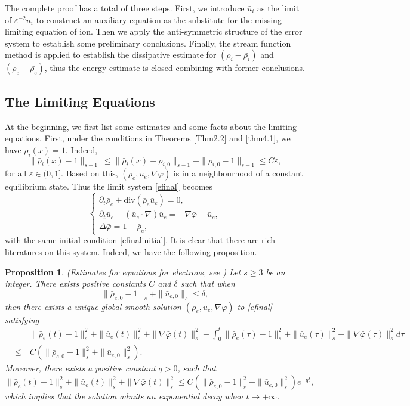 \documentclass[reqno,twoside,12pt,a4paper]{amsart}
\newcommand{\eps}{\mathbb{\varepsilon}}
\newcommand{\dive}{\mathrm{div}}
\newcommand{\pt}{\partial_t}
\newcommand{\D}{\nabla}
\newcommand{\vp}{\varphi}
\newtheorem{proposition}{Proposition}[section]
\numberwithin{equation}{section}
\begin{document}
The complete proof has a total of three steps. First, we introduce $\bar{u}_i$ as the limit of $\eps^{-2}u_i$ to construct an auxiliary equation as the substitute for the missing limiting equation of ion. Then we apply the anti-symmetric structure of the error system to establish some preliminary conclusions. Finally, the stream function method is applied to establish the dissipative estimate for $(\rho_i-\bar{\rho_i})$ and $(\rho_e-\bar{\rho_e})$, thus the energy estimate is closed combining with former conclusions.



\subsection{The Limiting Equations} At the beginning, we first list some estimates and some facts about the limiting equations. First, under the conditions in Theorems \ref{Thm2.2} and \ref{thm4.1}, we have $\bar{\rho}_i(x)=1$. Indeed, 
\[
    \|\bar{\rho}_i(x)-1\|_{s-1}\ \leq \|\bar{\rho}_i(x)-\rho_{i,0}\|_{s-1}+\|\rho_{i,0}-1\|_{s-1} \leq C \eps,
\]
for all $\eps\in(0,1]$. Based on this, $(\bar{\rho}_e, \bar{u}_e, \D\bar{\vp})$  is in a neighbourhood of a constant equilibrium state. Thus the limit system \eqref{efinal} becomes
\begin{equation}\label{efinal2}
\begin{cases}
\pt\bar{\rho}_e +\dive(\bar{\rho}_e \bar{u}_e)=0,\\
\pt \bar{u}_e +(\bar{u}_e\cdot\nabla)\bar{u}_e=-\D\bar{\vp}-\bar{u}_e,\\
\Delta \bar{\vp}=1-\bar{\rho}_e,
\end{cases}
\end{equation}
with the same initial condition \eqref{efinalinitial}. It is clear that there are rich literatures on this system. Indeed, we have the following proposition.
\begin{proposition}\label{danjiep}(Estimates for equations for electrons, see \cite{Hsiao2003,Peng2015}) Let $s\geq 3$ be an integer. There exists positive constants $C$ and $\delta$ such that when 
\[
\|\bar{\rho}_{e,0}-1\|_s+\|\bar{u}_{e,0}\|_s\leq \delta,
\]
then there exists a unique global smooth solution $(\bar{\rho}_e, \bar{u}_e, \D\bar{\vp})$  to \eqref{efinal} satisfying
\begin{eqnarray}\label{eregu}
&\quad& \|\bar{\rho}_e(t)-1\|_s^2+\|\bar{u}_e(t)\|_s^2+\|\D\bar{\vp}(t)\|_s^2+\int_0^t\|\bar{\rho}_e(\tau)-1\|_s^2+\|\bar{u}_e(\tau)\|_s^2+\|\D\bar{\vp}(\tau)\|_s^2d\tau\nonumber\\
&\leq& C(\|\bar{\rho}_{e,0}-1\|_s^2+\|\bar{u}_{e,0}\|_s^2).
  \end{eqnarray}
Moreover, there exists a positive constant $q>0$, such that
\[
\|\bar{\rho}_e(t)-1\|_s^2+\|\bar{u}_e(t)\|_s^2+\|\D\bar{\vp}(t)\|_s^2\leq C(\|\bar{\rho}_{e,0}-1\|_s^2+\|\bar{u}_{e,0}\|_s^2)e^{-qt},
\]
which implies that the solution admits an exponential decay when $t\to +\infty$. 
\end{proposition}
\end{document}
